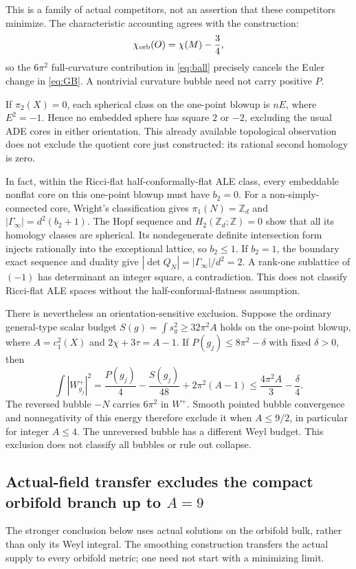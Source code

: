 \documentclass[11pt]{article}
\begin{document}
This is a family of actual competitors, not an assertion that these competitors minimize. The characteristic accounting agrees with the construction:
\[
 \chi_{\rm orb}(O)=\chi(M)-\frac34,
\]
so the $6\pi^2$ full-curvature contribution in \eqref{eq:ball} precisely cancels the Euler change in \eqref{eq:GB}. A nontrivial curvature bubble need not carry positive $P$.

If $\pi_2(X)=0$, each spherical class on the one-point blowup is $nE$, where $E^2=-1$. Hence no embedded sphere has square $2$ or $-2$, excluding the usual ADE cores in either orientation. This already available topological observation does not exclude the quotient core just constructed: its rational second homology is zero.

In fact, within the Ricci-flat half-conformally-flat ALE class, every embeddable nonflat core on this one-point blowup must have $b_2=0$. For a non-simply-connected core, Wright's classification gives $\pi_1(N)=\mathbb Z_d$ and $|\Gamma_\infty|=d^2(b_2+1)$. The Hopf sequence and $H_2(\mathbb Z_d;\mathbb Z)=0$ show that all its homology classes are spherical. Its nondegenerate definite intersection form injects rationally into the exceptional lattice, so $b_2\le1$. If $b_2=1$, the boundary exact sequence and duality give $|\det Q_N|=|\Gamma_\infty|/d^2=2$. A rank-one sublattice of $(-1)$ has determinant an integer square, a contradiction. This does not classify Ricci-flat ALE spaces without the half-conformal-flatness assumption.

There is nevertheless an orientation-sensitive exclusion. Suppose the ordinary general-type scalar budget $S(g)=\int s_g^2\ge32\pi^2A$ holds on the one-point blowup, where $A=c_1^2(X)$ and $2\chi+3\tau=A-1$. If $P(g_j)\le8\pi^2-\delta$ with fixed $\delta>0$, then
\begin{equation}\label{eq:Wbudget}
 \int|W^+_{g_j}|^2
 =\frac{P(g_j)}4-\frac{S(g_j)}{48}+2\pi^2(A-1)
 \le\frac{4\pi^2A}{3}-\frac\delta4.
\end{equation}
The reversed bubble $-N$ carries $6\pi^2$ in $W^+$. Smooth pointed bubble convergence and nonnegativity of this energy therefore exclude it when $A\le9/2$, in particular for integer $A\le4$. The unreversed bubble has a different Weyl budget. This exclusion does not classify all bubbles or rule out collapse.

\subsection{Actual-field transfer excludes the compact orbifold branch up to $A=9$}
The stronger conclusion below uses actual solutions on the orbifold bulk, rather than only its Weyl integral. The smoothing construction transfers the actual supply to every orbifold metric; one need not start with a minimizing limit.
\end{document}
